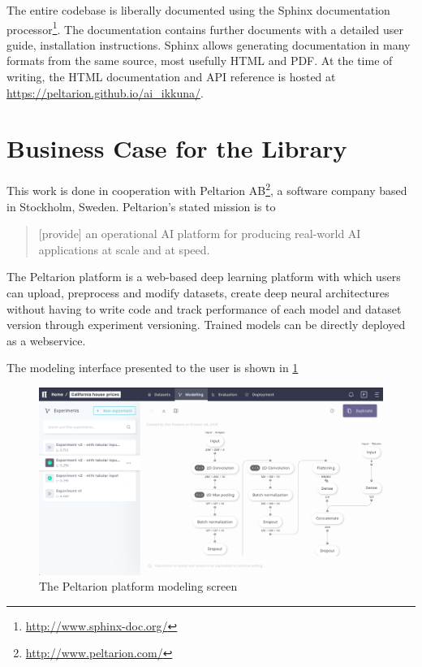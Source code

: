 The entire codebase is liberally documented using the Sphinx documentation
processor\footnote{\url{http://www.sphinx-doc.org/}}. The documentation contains
further documents with a detailed user guide, installation instructions. Sphinx
allows generating documentation in many formats from the same source, most
usefully HTML and PDF. At the time of writing, the HTML documentation and API
reference is hosted at \url{https://peltarion.github.io/ai_ikkuna/}.

\section{Business Case for the Library}\label{business-case}

This work is done in cooperation with Peltarion
AB\footnote{\url{http://www.peltarion.com/}}, a software company based in
Stockholm, Sweden. Peltarion's stated mission is to

\begin{quote}
    [provide] an
    operational AI platform for producing real-world AI applications at scale and at
    speed.
\end{quote}

The Peltarion platform is a web-based deep learning platform with which users
can upload, preprocess and modify datasets, create deep neural architectures
without having to write code and track performance of each model and dataset
version through experiment versioning. Trained models can be directly deployed
as a webservice.

The modeling interface presented to the user is shown in \cref{fig:platform}

\begin{figure}
    \centering
    \includegraphics[width=\textwidth]{gfx/diagrams/software_screens/peltarion_platform.png}
    \caption{The Peltarion platform modeling screen}
    \label{fig:platform}
\end{figure}

